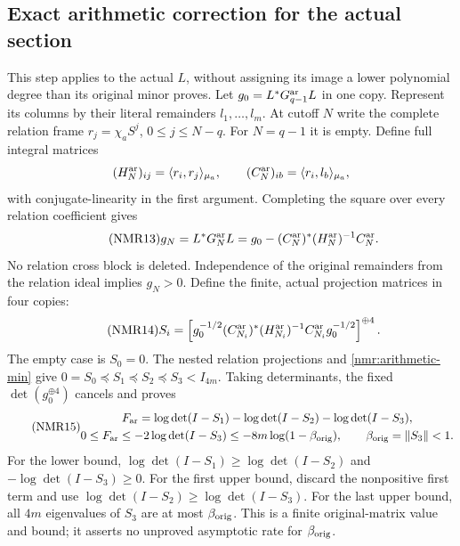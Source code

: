 \subsection{Exact arithmetic correction for the actual section}
This step applies to the actual $L$, without assigning its image a
lower polynomial degree than its original minor proves.
Let $g_0=L^*G_{q-1}^{\rm ar}L$ in one copy.
Represent its columns by their literal remainders $l_1,\ldots,l_m$.
At cutoff $N$ write the complete relation frame
$r_j=\chi_aS^j$, $0\leq j\leq N-q$.
For $N=q-1$ it is empty. Define full integral matrices
\[
(H_N^{\rm ar})_{ij}=\langle r_i,r_j\rangle_{\mu_a},\qquad
(C_N^{\rm ar})_{ib}=\langle r_i,l_b\rangle_{\mu_a},
\]
with conjugate-linearity in the first argument. Completing the square
over every relation coefficient gives
\begin{equation}\tag{NMR13}\label{nmr:arithmetic-min}
g_N=L^*G_N^{\rm ar}L
 =g_0-(C_N^{\rm ar})^*(H_N^{\rm ar})^{-1}C_N^{\rm ar}.
\end{equation}
No relation cross block is deleted. Independence of the original
remainders from the relation ideal implies $g_N>0$.
Define the finite, actual projection matrices in four copies:
\begin{equation}\tag{NMR14}\label{nmr:projection}
S_i=\left[
g_0^{-1/2}(C_{N_i}^{\rm ar})^*
(H_{N_i}^{\rm ar})^{-1}C_{N_i}^{\rm ar}g_0^{-1/2}
\right]^{\oplus4}.
\end{equation}
The empty case is $S_0=0$. The nested relation projections and
\eqref{nmr:arithmetic-min} give
$0=S_0\preceq S_1\preceq S_2\preceq S_3<I_{4m}$.
Taking determinants, the fixed $\det(g_0^{\oplus4})$ cancels and
proves
\begin{equation}\tag{NMR15}\label{nmr:Far}
\begin{gathered}
F_{\rm ar}
=\log\det(I-S_1)-\log\det(I-S_2)-\log\det(I-S_3),\\
0\leq F_{\rm ar}\leq-2\log\det(I-S_3)
              \leq-8m\log(1-\beta_{\rm orig}),\qquad
\beta_{\rm orig}=\|S_3\|<1 .
\end{gathered}
\end{equation}
For the lower bound, $\log\det(I-S_1)\geq\log\det(I-S_2)$
and $-\log\det(I-S_3)\geq0$.
For the first upper bound, discard the nonpositive first term and
use $\log\det(I-S_2)\geq\log\det(I-S_3)$.
For the last upper bound, all $4m$ eigenvalues of $S_3$ are at most
$\beta_{\rm orig}$.
This is a finite original-matrix value and bound; it asserts no
unproved asymptotic rate for $\beta_{\rm orig}$.

